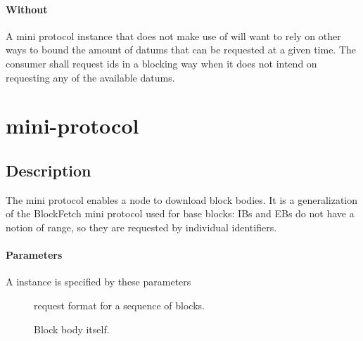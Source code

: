 \paragraph{Without \BoundedWindow{}} A \relay{} mini protocol instance that does not make use of \BoundedWindow{} will want to rely on other ways to bound the amount of datums that can be requested at a given time.
The consumer shall request ids in a blocking way when it does not
intend on requesting any of the available datums.


\section{\fetch{} mini-protocol}
\label{ptcl:fetch}

\renewcommand{\StIdle}{\state{StIdle}}
\renewcommand{\StBusy}{\state{StBusy}}
\newcommand{\StStreaming}{\state{StStreaming}}
\renewcommand{\StDone}{\state{StDone}}
\newcommand{\MsgRequestBodies}{\msg{MsgRequestBodies}}
\newcommand{\MsgStartBatch}{\msg{MsgStartBatch}}
\newcommand{\MsgNoBlocks}{\msg{MsgNoBlocks}}
\newcommand{\MsgBody}{\msg{MsgBody}}
\newcommand{\MsgBatchDone}{\msg{MsgBatchDone}}
\newcommand{\MsgConsumerDone}{\msg{MsgConsumerDone}}
\newcommand{\point}{\text{point}}
\newcommand{\slot}{\text{slot}}
\newcommand{\body}{\text{body}}
\newcommand{\request}{\text{request}}
\newcommand{\hash}{\text{hash}}
\newcommand{\rbrange}{\text{range}}
\subsection{Description}

The \fetch{} mini protocol enables a node to download block bodies.
It is a generalization of the BlockFetch mini protocol used for
base blocks: IBs and EBs do not have a notion of range, so they are
requested by individual identifiers.

\paragraph{Parameters} A \fetch{} instance is specified by these parameters
\begin{description}
\item [\request{}] request format for a sequence of blocks.
\item [\body{}] Block body itself.
\end{description}

